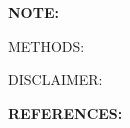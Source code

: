 \documentclass[
	letterpaper, %
	11pt, %
]{CSSullivanBusinessReport}
\begin{document}
\par
\textbf{NOTE:} 

{\footnotesize
METHODS: 

DISCLAIMER: 
}




\par
{\tiny
\textbf{REFERENCES:}\\

}
\end{document}
